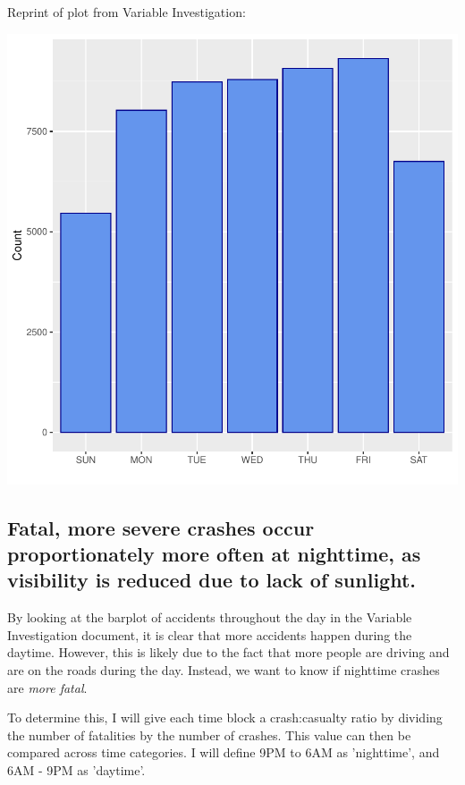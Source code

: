 \documentclass[11pt, a4paper]{article}
\begin{document}
\begin{Schunk}
\begin{Soutput}
Reprint of plot from Variable Investigation:
\end{Soutput}
\end{Schunk}
\includegraphics{regression-048}




\pagebreak
\subsection{Fatal, more severe crashes occur proportionately more often at nighttime, as visibility is reduced due to lack of sunlight.} 

By looking at the barplot of accidents throughout the day in the Variable Investigation document, it is clear that more accidents happen during the daytime. However, this is likely due to the fact that more people are driving and are on the roads during the day. Instead, we want to know if nighttime crashes are \textit{more fatal}. 
\par
To determine this, I will give each time block a crash:casualty ratio by dividing the number of fatalities by the number of crashes. This value can then be compared across time categories. I will define 9PM to 6AM as 'nighttime', and 6AM - 9PM as 'daytime'.
\end{document}
